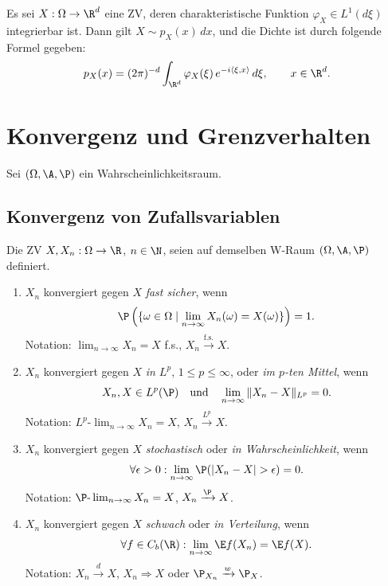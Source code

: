 \documentclass[11pt, a4paper]{article}
\begin{document}
\begin{theorem}[Umkehrformel] \Theorem
    Es sei $X: \Omega \to \R^d$ eine ZV, deren charakteristische Funktion $\varphi_X \in L^1(d\xi)$ integrierbar ist. Dann gilt $X \sim p_X(x) \, dx$, und die Dichte ist durch folgende Formel gegeben:
    $$p_X(x) = (2\pi)^{-d} \int_{\R^d} \varphi_X(\xi) \, e^{-i\langle \xi, x\rangle} \, d\xi, \qquad x \in \R^d.$$
\end{theorem}

\newpage


\section{Konvergenz und Grenzverhalten}
Sei $(\Omega, \A, \P)$ ein Wahrscheinlichkeitsraum.
\subsection{Konvergenz von Zufallsvariablen}
\begin{definition}[Konvergenzarten] \Theorem
    Die ZV $X, X_n: \Omega \to \R$, $n \in \N$, seien auf demselben W-Raum $(\Omega, \A, \P)$ definiert.
    \begin{enumerate}[label=\alph*)]
        \item $X_n$ konvergiert gegen $X$ \emph{fast sicher}, wenn
        $$\P\left(\{\omega \in \Omega \mid \lim_{n \to \infty} X_n(\omega) = X(\omega)\}\right) = 1.$$
        Notation: $\lim_{n \to \infty} X_n = X$ f.s., $X_n \xrightarrow{\text{f.s.}} X$.

        \item $X_n$ konvergiert gegen $X$ \emph{in $L^p$}, $1 \le p \le \infty$, oder \emph{im $p$-ten Mittel}, wenn
        $$X_n, X \in L^p(\P) \quad \text{und} \quad \lim_{n \to \infty} \|X_n - X\|_{L^p} = 0.$$
        Notation: $L^p\text{-}\lim_{n \to \infty} X_n = X$, $X_n \xrightarrow{L^p} X$.

        \item $X_n$ konvergiert gegen $X$ \emph{stochastisch} oder \emph{in Wahrscheinlichkeit}, wenn
        $$\forall \epsilon > 0: \lim_{n \to \infty} \P(|X_n - X| > \epsilon) = 0.$$
        Notation: $\P\text{-}\lim_{n \to \infty} X_n = X$, $X_n \xrightarrow{\P} X$.
        \item $X_n$ konvergiert gegen $X$ \emph{schwach} oder \emph{in Verteilung}, wenn
        $$\forall f \in C_b(\R): \lim_{n \to \infty} \E f(X_n) = \E f(X).$$
        Notation: $X_n \xrightarrow{d} X$, $X_n \Rightarrow X$ oder $\P_{X_n} \xrightarrow{w} \P_X$.
    \end{enumerate}
\end{definition}
\end{document}
